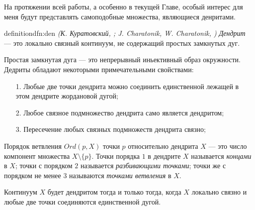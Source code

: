 %

На протяжении всей работы, а особенно в текущей Главе, особый интерес для меня будут представлять самоподобные множества, являющиеся денритами. 

\begin{restatethis}{definition}{dfn:den} %
{\em (К. Куратовский, \cite{Kur}; J. Charatonik, W. Charatonik, \cite{Char})}
{\em Дендрит} --- это локально связный континуум, не содержащий простых замкнутых дуг.     
\end{restatethis}

Простая замкнутая дуга --- это непрерывный иньективный образ окружности.
Дедриты обладают некоторыми примечательными свойствами:
\begin{enumerate}[nolistsep]
\item[1.] Любые две точки дендрита можно соединить единственной лежащей в этом дендрите жордановой дугой;
\item[2.] Любое связное подмножество дендрита само является дендритом;
\item[3.] Пересечение любых связных подмножеств дендрита связно;
\end{enumerate}

Порядок ветвления $Ord(p,X)$ точки $p$ относительно дендрита $X$ --- это число компонент множества $X\setminus\{p\}$.
Точки порядка $1$ в дендрите $X$ называется {\em концами} в $X$; точки с порядком  $2$ называется {\em разбивающими точками}; точки же с порядком не менее $3$ называются {\em точками ветвления} в $X$.

Континуум $X$ будет дендритом тогда и только тогда, когда $X$ локально связно и  любые две точки соединяются единственной дугой. \\

